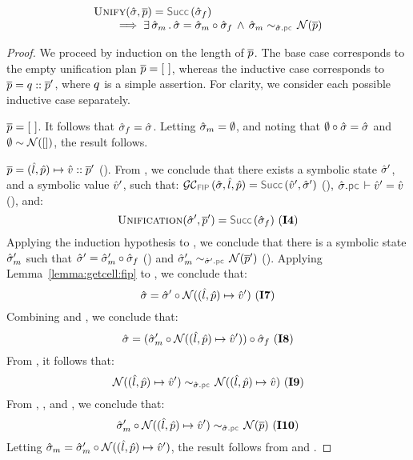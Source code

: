 \begin{lemma}\label{lemma:soundness:unification:success}
$$
\begin{array}{l}
\unificationfun(\sstate, \jvec{\spass}) = \success{\sstate_f} \\ \quad \quad
  \implies 
   \exists \, \sstate_m \, . \, 
   \sstate = \sstate_m \statecompose \sstate_f 
   \, \wedge \, 
    \stateequivrel{\sstate_m}{\normaliser(\jvec{\spass})}{\sstate.\pcsel}
\end{array}
$$
\end{lemma}
\begin{proof}
We proceed by induction on the length of $\overline{p}$. The base case corresponds to the empty unification plan $\overline{p} = [ \ ]$, 
whereas the inductive case corresponds to $\overline{p} = q :: \overline{p}'$, where $q$ is a simple 
assertion. For clarity, we consider each possible inductive case separately. 
\vspace{3pt}

\noindent {} $\overline{p} = [ \ ]$. It follows that
$\hat{\sigma}_f = \hat{\sigma}$. Letting  $\hat{\sigma}_m = \emptyset$, 
and noting that $\emptyset \circ \hat{\sigma} = \hat{\sigma}$ and $\emptyset \sim \mathcal{N}([])$, the result follows. 
 \vspace{5pt}

\noindent {} 
$\overline{p} = (\hat{l}, \hat{p}) \mapsto \hat{v} :: \overline{p}'$ (). 
From , we conclude that there exists a symbolic state $\hat{\sigma}'$, 
and a symbolic value $\hat{v}'$, such that: 
$\GetCellV{\sstate, \sloc, \sexprp} = \success{\sexprv', \sstate'}$ (),
$\sstate.\pcsel \vdash \sexprv' = \sexprv$ (), and:
$$
\unificationfunction(\sstate', \jvec{\spass}') = \success{\sstate_f} \text{ (\ieq{4})}
$$ 
Applying the induction hypothesis to , we conclude that there is a symbolic state 
$\hat{\sigma}_m'$ such that  $\hat{\sigma}' = \hat{\sigma}_m' \circ \hat{\sigma}_f$ () and 
$\stateequivrel{\sstate_m'}{\normaliser(\jvec{\spass}')}{\sstate'.\pcsel}$ (). 
Applying Lemma~\ref{lemma:getcell:fip} to , we conclude that:
$$\hat{\sigma} = \hat{\sigma}' \circ \mathcal{N}((\hat{l}, \hat{p}) \mapsto \hat{v}') \text{ ({\bf I7})}$$   
Combining  and , we conclude that: 
$$
\hat{\sigma} = (\hat{\sigma}_m' \circ \mathcal{N}((\hat{l}, \hat{p}) \mapsto \hat{v}')) \circ \hat{\sigma}_f  \text{ ({\bf I8})}
$$
From , it follows that: 
$$
\stateequivrel{\normaliser((\sloc, \sexprp) \pointsto \sexprv')}{\normaliser((\sloc, \sexprp) \pointsto \sexprv)}{\sstate.\pcsel} \text{ (\ieq{9})}
$$
From , , and , we conclude that: 
$$
\stateequivrel{\sstate_m' \statecompose \normaliser((\sloc, \sexprp) \pointsto \sexprv')}{\normaliser(\jvec{\spass})}{\sstate.\pcsel} \text{ (\ieq{10})}
$$
Letting $\hat{\sigma}_m = \hat{\sigma}_m' \circ \mathcal{N}((\hat{l}, \hat{p}) \mapsto \hat{v}')$, the result follows 
from  and . 
\vspace{5pt}


\end{proof}
